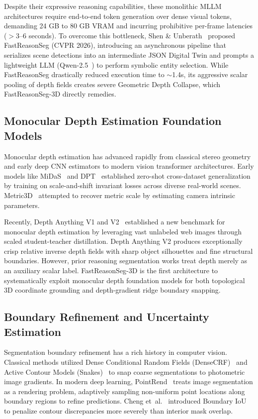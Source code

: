 \documentclass[10pt,twocolumn,letterpaper]{article}
\begin{document}
Despite their expressive reasoning capabilities, these monolithic MLLM architectures require end-to-end token generation over dense visual tokens, demanding 24 GB to 80 GB VRAM and incurring prohibitive per-frame latencies ($>$3--6 seconds). To overcome this bottleneck, Shen \& Unberath~\cite{shen2026fast} proposed FastReasonSeg (CVPR 2026), introducing an asynchronous pipeline that serializes scene detections into an intermediate JSON Digital Twin and prompts a lightweight LLM (Qwen-2.5~\cite{yang2024qwen2}) to perform symbolic entity selection. While FastReasonSeg drastically reduced execution time to $\sim$1.4s, its aggressive scalar pooling of depth fields creates severe Geometric Depth Collapse, which FastReasonSeg-3D directly remedies.

\subsection{Monocular Depth Estimation Foundation Models}
Monocular depth estimation has advanced rapidly from classical stereo geometry and early deep CNN estimators to modern vision transformer architectures. Early models like MiDaS~\cite{ranftl2020towards} and DPT~\cite{ranftl2021vision} established zero-shot cross-dataset generalization by training on scale-and-shift invariant losses across diverse real-world scenes. Metric3D~\cite{yin2023metric3d} attempted to recover metric scale by estimating camera intrinsic parameters. 

Recently, Depth Anything V1 and V2~\cite{yang2024depthanything} established a new benchmark for monocular depth estimation by leveraging vast unlabeled web images through scaled student-teacher distillation. Depth Anything V2 produces exceptionally crisp relative inverse depth fields with sharp object silhouettes and fine structural boundaries. However, prior reasoning segmentation works treat depth merely as an auxiliary scalar label. FastReasonSeg-3D is the first architecture to systematically exploit monocular depth foundation models for both topological 3D coordinate grounding and depth-gradient ridge boundary snapping.

\subsection{Boundary Refinement and Uncertainty Estimation}
Segmentation boundary refinement has a rich history in computer vision. Classical methods utilized Dense Conditional Random Fields (DenseCRF)~\cite{krahenbuhl2011efficient} and Active Contour Models (Snakes)~\cite{kass1988snakes} to snap coarse segmentations to photometric image gradients. In modern deep learning, PointRend~\cite{kirillov2020pointrend} treats image segmentation as a rendering problem, adaptively sampling non-uniform point locations along boundary regions to refine predictions. Cheng et~al.~\cite{cheng2021boundary} introduced Boundary IoU to penalize contour discrepancies more severely than interior mask overlap. 
\end{document}
